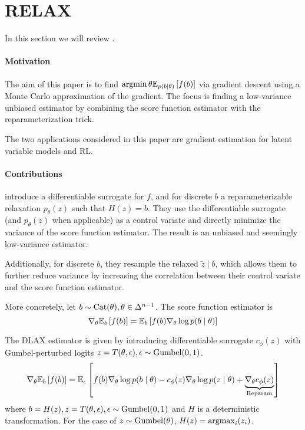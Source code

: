\section{RELAX}
In this section we will review \citet{grathwohl2017relax}.

\paragraph{Motivation}
The aim of this paper is to find $\operatorname*{argmin}\theta \mathbb{E}_{p(b \mid \theta)}\left[f(b)\right]$
via gradient descent using a Monte Carlo approximation of the gradient.
The focus is finding a low-variance unbiased estimator by combining
the score function estimator with the reparameterization trick.

The two applications considered in this paper are gradient
estimation for latent variable models and RL.

\paragraph{Contributions}
\citet{grathwohl2017relax} introduce a differentiable surrogate for $f$, and for discrete $b$
a reparameterizable relaxation $p_\theta(z)$ such that $H(z) = b$.
They use the differentiable surrogate (and $p_\theta(z)$ when applicable) as a control
variate and directly minimize the variance of the score function estimator.
The result is an unbiased and seemingly low-variance estimator.

Additionally, for discrete $b$,
they resample the relaxed $\tilde{z} \mid b$,
which allows them to further reduce variance by increasing the correlation between
their control variate and the score function estimator.

More concretely, let $b \sim \mathrm{Cat}(\theta), \theta \in \Delta^{n-1}$.
The score function estimator is
\begin{equation}
\nabla_\theta \mathbb{E}_{b}\left[f(b)\right] = \mathbb{E}_{b}\left[f(b)\nabla_\theta \log p(b\mid\theta)\right]
\end{equation}

The DLAX estimator is given by introducing differentiable surrogate $c_\phi(z)$
with Gumbel-perturbed logits $z = T(\theta, \epsilon), \epsilon\sim\mathrm{Gumbel}(0,1)$.
\begin{equation}
\nabla_\theta \mathbb{E}_{b}\left[f(b)\right] = \mathbb{E}_{\epsilon}\left[f(b)\nabla_\theta \log p(b\mid\theta)
- c_\phi(z)\nabla_\theta \log p(z \mid \theta)
+ \underbrace{\nabla_\theta c_\phi(z)}_\textrm{Reparam}\right]
\end{equation}
where $b = H(z), z=T(\theta,\epsilon),\epsilon\sim \mathrm{Gumbel}(0,1)$ and $H$ is a deterministic transformation.
For the case of $z\sim\mathrm{Gumbel}(\theta)$, $H(z) = \operatorname*{argmax}_i(z_i)$.

